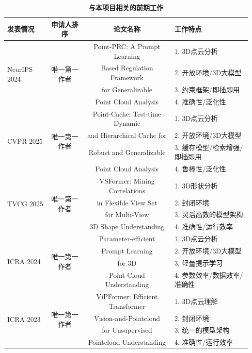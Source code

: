 \documentclass[12pt]{article}
\begin{document}
\begin{table}[ht]
   \footnotesize
   \centering
   \caption{\textbf{与本项目相关的前期工作}}
   \begin{tabular}{l c c l}
      \toprule
      发表情况 & 申请人排序 & 论文名称 & 工作特点\\
      \midrule
      \multirow{4}{*}{NeurIPS 2024} & \multirow{4}{*}{唯一第一作者} & Point-PRC: A Prompt Learning   & 1. 3D点云分析 \\
      & & Based Regulation Framework   & 2. 开放环境/3D大模型 \\      
      & & for Generalizable & 3. 约束框架/即插即用 \\
      & & Point Cloud Analysis & 4. 准确性/泛化性 \\
      \midrule
      \multirow{4}{*}{CVPR 2025} & \multirow{4}{*}{唯一第一作者} & Point-Cache: Test-time Dynamic & 1. 3D点云分析 \\
      & & and Hierarchical Cache for  & 2. 开放环境/3D大模型 \\
      & & Robust and Generalizable & 3. 缓存模型/检索增强/即插即用 \\
      & & Point Cloud Analysis & 4. 鲁棒性/泛化性 \\
      \midrule
      \multirow{4}{*}{TVCG 2025} & \multirow{4}{*}{唯一第一作者} & VSFormer: Mining Correlations & 1. 3D形状分析 \\
      & & in Flexible View Set & 2. 封闭环境 \\
      & & for Multi-View & 3. 灵活高效的模型架构 \\
      & & 3D Shape Understanding & 4. 准确性/运行效率 \\
      \midrule
      \multirow{4}{*}{ICRA 2024} & \multirow{4}{*}{唯一第一作者} & Parameter-efficient    & 1. 3D点云分析 \\
      & & Prompt Learning  & 2. 开放环境/3D大模型 \\
      & & for 3D & 3. 轻量提示学习 \\
      & & Point Cloud Understanding & 4. 参数效率/数据效率/准确性 \\
      \midrule
      \multirow{4}{*}{ICRA 2023} & \multirow{4}{*}{唯一第一作者} & ViPFormer: Efficient  Transformer & 1. 3D点云理解 \\
      & & Vision-and-Pointcloud  & 2. 封闭环境 \\
      & & for Unsupervised & 3. 统一的模型架构 \\ %
      & & Pointcloud Understanding & 4. 准确性/运行效率 \\
      \bottomrule
   \end{tabular}
   \label{tab:research_foundation}
\end{table}
\end{document}
